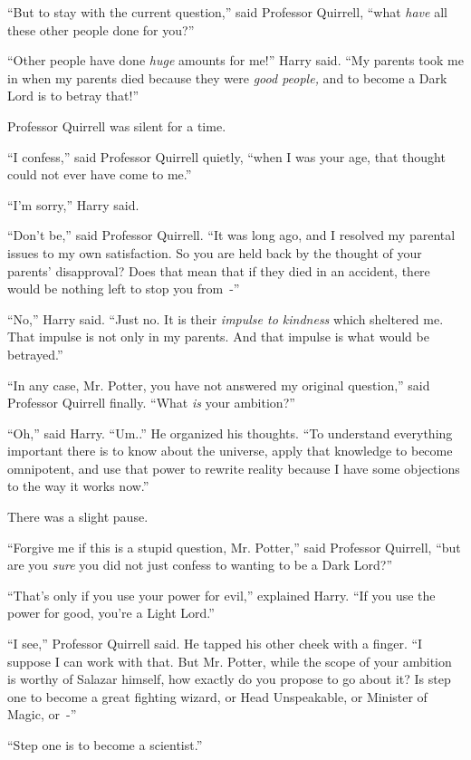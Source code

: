 ``But to stay with the current question,'' said Professor Quirrell, ``what \emph{have} all these other people done for you?''

``Other people have done \emph{huge} amounts for me!'' Harry said. ``My parents took me in when my parents died because they were \emph{good people,} and to become a Dark Lord is to betray that!''

Professor Quirrell was silent for a time.

``I confess,'' said Professor Quirrell quietly, ``when I was your age, that thought could not ever have come to me.''

``I'm sorry,'' Harry said.

``Don't be,'' said Professor Quirrell. ``It was long ago, and I resolved my parental issues to my own satisfaction. So you are held back by the thought of your parents' disapproval? Does that mean that if they died in an accident, there would be nothing left to stop you from~-''

``No,'' Harry said. ``Just no. It is their \emph{impulse to kindness} which sheltered me. That impulse is not only in my parents. And that impulse is what would be betrayed.''

``In any case, Mr. Potter, you have not answered my original question,'' said Professor Quirrell finally. ``What \emph{is} your ambition?''

``Oh,'' said Harry. ``Um..'' He organized his thoughts. ``To understand everything important there is to know about the universe, apply that knowledge to become omnipotent, and use that power to rewrite reality because I have some objections to the way it works now.''

There was a slight pause.

``Forgive me if this is a stupid question, Mr. Potter,'' said Professor Quirrell, ``but are you \emph{sure} you did not just confess to wanting to be a Dark Lord?''

``That's only if you use your power for evil,'' explained Harry. ``If you use the power for good, you're a Light Lord.''

``I see,'' Professor Quirrell said. He tapped his other cheek with a finger. ``I suppose I can work with that. But Mr. Potter, while the scope of your ambition is worthy of Salazar himself, how exactly do you propose to go about it? Is step one to become a great fighting wizard, or Head Unspeakable, or Minister of Magic, or~-''

``Step one is to become a scientist.''

